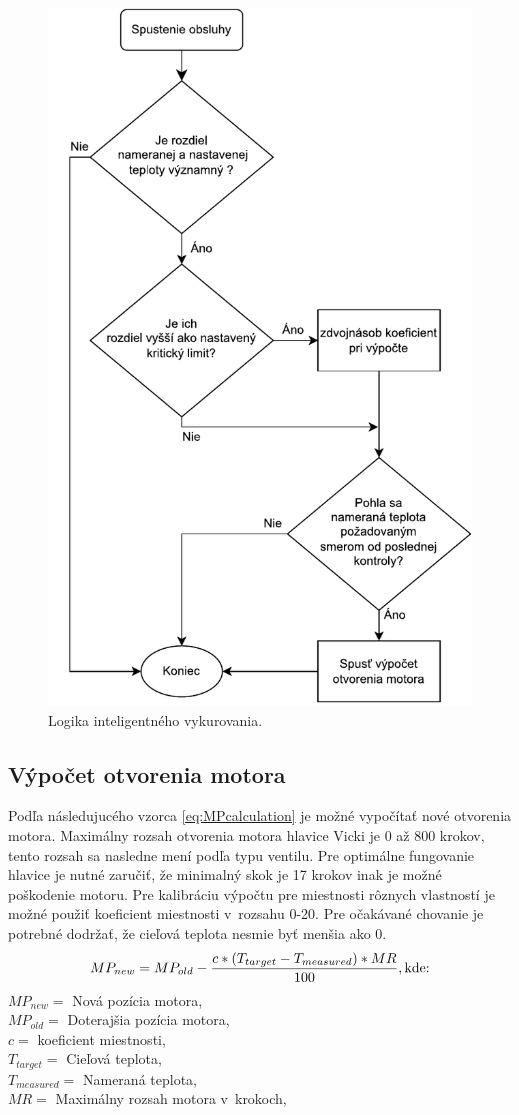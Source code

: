 \begin{figure}[H]
    \centering
    \includegraphics[width=0.65\columnwidth]{obrazky-figures/Algo (4).pdf}
    \caption{Logika inteligentného vykurovania.}
    \label{fig:ProportionalAlgLogic}
\end{figure}
\subsection*{Výpočet otvorenia motora}
Podľa následujucého vzorca \ref{eq:MPcalculation} je možné vypočítať nové otvorenia motora. 
Maximálny rozsah otvorenia motora hlavice Vicki je 0 až 800 krokov, tento rozsah sa nasledne mení podľa typu ventilu. 
Pre optimálne fungovanie hlavice je nutné zaručiť, že minimalný skok je 17 krokov inak je možné poškodenie motoru. 
Pre kalibráciu výpočtu pre miestnosti rôznych vlastností je možné použiť koeficient miestnosti v~rozsahu 0-20. 
Pre očakávané chovanie je potrebné dodržať, že cieľová teplota nesmie byť menšia ako 0.
\begin{equation}
    \centering
    \label{eq:MPcalculation}
    MP_{new} = MP_{old} - \frac{c * (T_{target} - T_{measured})*{MR}}{100}, \text{kde:}
 \end{equation}
 $MP_{new} =$ Nová pozícia motora,\\
$MP_{old} =$ Doterajšia pozícia motora,\\
$c = $ koeficient miestnosti,\\
$T_{target} = $ Cieľová teplota,\\
$T_{measured} = $ Nameraná teplota,\\
$MR = $ Maximálny rozsah motora v~krokoch,\\
